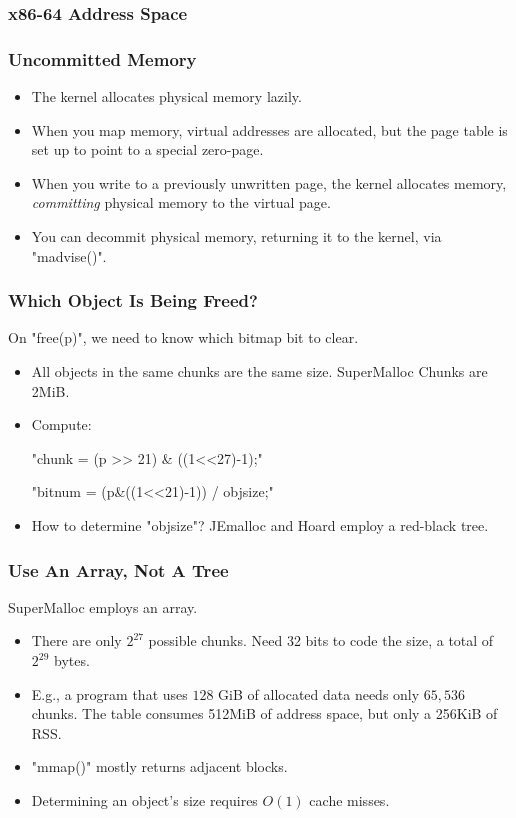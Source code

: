 \documentclass[xcolor=dvipsnames,14pt]{beamer}
\begin{document}
\begin{frame}[fragile]
\frametitle{x86-64 Address Space}


\end{frame}

\begin{frame}[fragile]
\frametitle{Uncommitted Memory}

\begin{itemize}
\item The kernel allocates physical memory lazily.
\item When you map memory, virtual addresses are allocated, but the page table is set up to point to a special zero-page.
\item When you write to a previously unwritten page, the kernel allocates memory, \textit{committing} physical memory to the virtual page.
\item You can decommit physical memory, returning it to the kernel, via "madvise()".
\end{itemize}

\end{frame}

\begin{frame}[fragile]
\frametitle{Which Object Is Being Freed?}

On "free(p)", we need to know which bitmap bit to clear.
\begin{itemize}
\item All objects in the same chunks are the same size.  SuperMalloc Chunks are 2MiB.

\item Compute:

  "chunk  = (p >> 21) & ((1<<27)-1);"

  "bitnum = (p&((1<<21)-1)) / objsize;"

\item How to determine "objsize"?
JEmalloc and Hoard employ a red-black tree.
\end{itemize}
\end{frame}

\begin{frame}[fragile]
\frametitle{Use An Array, Not A Tree}

SuperMalloc employs an array.
\begin{itemize}
\item There are only $2^{27}$ possible chunks.  Need 32 bits to code the size, a total of
$2^{29}$ bytes.

\item E.g., a program that uses $128$ GiB of allocated data needs only
  $65,536$ chunks.  The table consumes 512MiB of address space, but
  only a 256KiB of RSS.

\item "mmap()" mostly returns adjacent blocks.

\item Determining an object's size requires $O(1)$ cache misses.
\end{itemize}
\end{frame}
\end{document}
